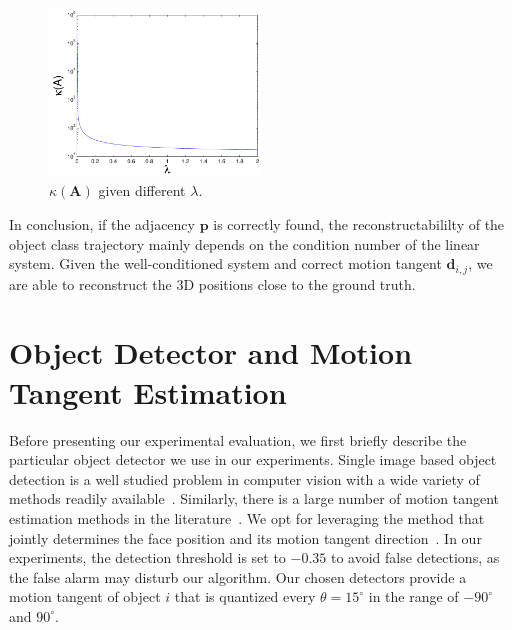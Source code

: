 \begin{figure}
\centering
\includegraphics[width=0.5\textwidth]{chapter4/resource/conditionNum_lamda.pdf}
\caption{$\kappa(\mathbf{A})$ given different $\lambda$.}
\label{fig:conditionNum_lamda}
\end{figure}

In conclusion, if the adjacency $\mathbf{p}$ is correctly found, the reconstructabililty of the object class trajectory mainly depends on the condition number of the linear system. Given the well-conditioned system and correct motion tangent $\mathbf{d}_{i,j}$, we are able to reconstruct the 3D positions close to the ground truth.




\section{Object Detector and Motion Tangent Estimation}
\label{sec:face_detection}
Before presenting our experimental evaluation, we first briefly describe the particular object detector we use in our experiments.
Single image based object detection is a well studied problem in computer vision with a wide variety of methods readily available~\cite{Zhang2006Local,Dalal2005HOG,lsvm-pami}. Similarly, there is a large number of motion tangent estimation methods in the literature~\cite{Blanz2003face,Gu20063D,jain2010fddb,jones2003fast}.
We opt for leveraging the method that jointly determines the face position and its motion tangent direction~\cite{Xiangxin_CVPR12}.
In our experiments,
the detection threshold is set to $-0.35$ to avoid false detections, as the false alarm may disturb our algorithm. Our chosen detectors provide a motion tangent of object $i$ that is  quantized every $\theta=15^{\circ}$ in the range of $-90^{\circ}$ and $90^{\circ}$.

